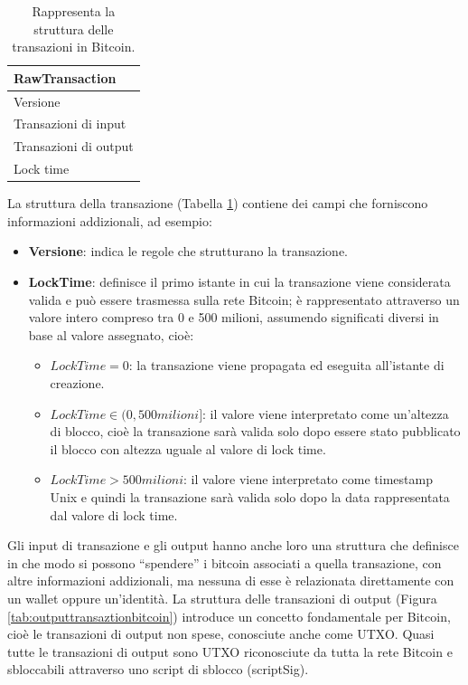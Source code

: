 \begin{table}[H]
       \centering\small
           \begin{tabular}{l}
               \toprule
               RawTransaction\\
               \midrule
               Versione   \\
               Transazioni di input \\
               Transazioni di output \\
               Lock time \\
               \bottomrule
       \end{tabular}
       \caption{Rappresenta la struttura delle transazioni in Bitcoin.\label{tab:rawtransactionbitcoin}}
   \end{table}

La struttura della transazione (Tabella \ref{tab:rawtransactionbitcoin}) contiene dei campi che forniscono informazioni addizionali, ad esempio:
\begin{itemize}
  \item {\bf Versione\/}: indica le regole che strutturano la transazione.
  \item {\bf LockTime\/}: definisce il primo istante in cui la transazione viene considerata valida e può essere trasmessa sulla rete Bitcoin; è rappresentato attraverso un valore intero compreso tra 0 e 500 milioni, assumendo  significati diversi in base al valore assegnato, cioè:
  \begin{itemize}
    \item \(LockTime = 0 \): la transazione viene propagata ed eseguita all’istante di creazione.
    \item \( LockTime \in (0, 500 milioni] \): il valore viene interpretato come un’altezza di blocco, cioè la transazione sarà valida solo dopo essere stato pubblicato il blocco con altezza uguale al valore di lock time.
    \item \(LockTime > 500 milioni \): il valore viene interpretato come timestamp Unix e quindi la transazione sarà valida solo dopo la data rappresentata dal valore di lock time.
  \end{itemize}
\end{itemize}

Gli input di transazione e gli output hanno anche loro una struttura che definisce in che modo si possono “spendere” i bitcoin associati a quella transazione, con altre informazioni addizionali, ma nessuna di esse è relazionata direttamente con un wallet oppure un’identità. \newline
La struttura delle transazioni di output (Figura \ref{tab:outputtransaztionbitcoin}) introduce un concetto fondamentale per Bitcoin, cioè le transazioni di output non spese, conosciute anche come UTXO.
Quasi tutte le transazioni di output sono UTXO riconosciute da tutta la rete Bitcoin e sbloccabili attraverso uno script di sblocco (scriptSig).


